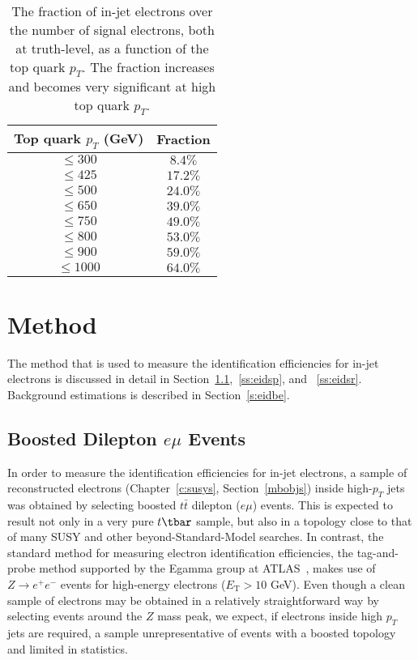 \renewcommand{\arraystretch}{1.15}
\begin{table}
	\centering
	\begin{tabular}{||c c||}
		\hline
		Top quark $p_T$ (GeV) & Fraction  \\ [0.5ex]
		\hline\hline
		\toprule
		$\leq 300$            & $ 8.4\%$  \\
		\hline
		$\leq 425$            & $ 17.2\%$ \\
		\hline
		$\leq 500$            & $ 24.0\%$ \\
		\hline
		$ \leq 650$           & $ 39.0\%$ \\
		\hline
		$ \leq 750$           & $ 49.0\%$ \\
		\hline
		$ \leq 800$           & $ 53.0\%$ \\
		\hline
		$ \leq 900$           & $ 59.0\%$ \\
		\hline
		$ \leq 1000$          & $ 64.0\%$ \\
		\hline
	\end{tabular}

	\caption{The fraction of in-jet electrons over the number of signal
		electrons, both at truth-level, as a function of the top quark $p_T$. The
		fraction increases and becomes very significant at high top quark $p_T$.}

	\label{t:injetfraction}
\end{table}
\renewcommand{\arraystretch}{1.0}




\section{Method}\label{s:eidmet}

The method that is used to measure the identification efficiencies for in-jet
electrons is discussed in detail in Section~\ref{ss:eidtp},~\ref{ss:eidsp}, and
~\ref{ss:eidsr}. Background estimations is described in Section~\ref{s:eidbe}.

\subsection{Boosted Dilepton $e\mu$ Events}\label{ss:eidtp}

In order to measure the identification efficiencies for in-jet electrons, a
sample of reconstructed electrons (Chapter~\ref{c:susys}, Section~\ref{mbobjs})
inside high-$p_T$ jets was obtained by selecting boosted $t\bar{t}$ dilepton
($e\mu$) events. This is expected to result not only in a very pure $t\tbar$
sample, but also in a topology close to that of many SUSY and other
beyond-Standard-Model searches. In contrast, the standard method for measuring
electron identification efficiencies, the tag-and-probe method supported by the
Egamma group at ATLAS~\cite{eleffme}, makes use of $Z\to e^+e^-$ events for
high-energy electrons ($E_{\text{T}} > 10$ GeV). Even though a clean sample of
electrons may be obtained in a relatively straightforward way by selecting
events around the $Z$ mass peak, we expect, if electrons inside high $p_T$ jets
are required, a sample unrepresentative of events with a boosted topology and
limited in statistics.

